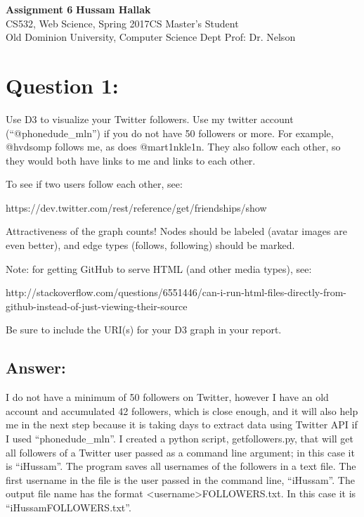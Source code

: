 \documentclass[a4paper, 11pt]{article}
\begin{document}
\noindent
\large\textbf{Assignment 6} \hfill \textbf{Hussam Hallak} \\
\normalsize CS532, Web Science, Spring 2017\hfill CS Master's Student \\
Old Dominion University, Computer Science Dept \hfill Prof: Dr. Nelson 

\section*{Question 1:}
Use D3 to visualize your Twitter followers.  Use my twitter account
(``@phonedude\_mln'') if you do not have 50 followers or more.  For example,
@hvdsomp follows me, as does @mart1nkle1n. They also follow each
other, so they would both have links to me and links to each other.

To see if two users follow each other, see:

https://dev.twitter.com/rest/reference/get/friendships/show

Attractiveness of the graph counts!  Nodes should be labeled (avatar
images are even better), and edge types (follows, following) should
be marked.

Note: for getting GitHub to serve HTML (and other media types), see:

http://stackoverflow.com/questions/6551446/can-i-run-html-files-directly-from-github-instead-of-just-viewing-their-source

Be sure to include the URI(s) for your D3 graph in your report. 

\subsection*{Answer:}
I do not have a minimum of 50 followers on Twitter, however I have an old account and accumulated 42 followers, which is close enough, and it will also help me in the next step because it is taking days to extract data using Twitter API if I used ``phonedude\_mln''. I created a python script, getfollowers.py, that will get all followers of a Twitter user passed as a command line argument; in this case it is ``iHussam''. The program saves all usernames of the followers in a text file. The first username in the file is the user passed in the command line, ``iHussam''. The output file name has the format <username>FOLLOWERS.txt. In this case it is ``iHussamFOLLOWERS.txt''.


\end{document}
